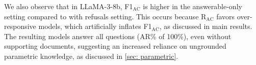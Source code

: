 \documentclass{article} %
\newcommand{\method}[0]{\textsc{Trust-Align}}
\newcommand{\metric}[0]{\textsc{Trust-Score}}
\begin{document}
We also observe that in LLaMA-3-8b, F1$_{\text{AC}}$ is higher in the answerable-only setting compared to with refusals setting. This occurs because R$_{\text{AC}}$ favors over-responsive models, which artificially inflates {F1$_{\text{AC}}$}, as discussed in main results. The resulting models answer all questions (AR\% of 100\%), even without supporting documents, suggesting an increased reliance on ungrounded parametric knowledge, as discussed in \cref{sec: parametric}.






\end{document}
